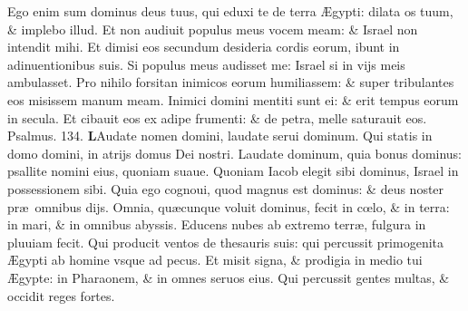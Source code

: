 \documentclass[a5paper,10pt]{book}
\def\ae{æ}
\def\AE{Æ}
\def\oe{œ}
\begin{document}
\begin{multicols*}{2}
\newline \color{red} E\color{black}go enim sum dominus deus tuus, qui eduxi te de terra \AE gypti: dilata os tuum, \& implebo illud.
\newline \color{red} E\color{black}t non audiuit populus meus vocem meam: \& Israel non intendit mihi.
\newline \color{red} E\color{black}t dimisi eos secundum desideria cordis eorum, ibunt in adinuentionibus suis.
\newline \color{red} S\color{black}i populus meus audisset me: Israel si in vijs meis ambulasset.
\newline \color{red} P\color{black}ro nihilo forsitan inimicos eorum humiliassem: \& super tribulantes eos misissem manum meam.
\newline \color{red} I\color{black}nimici domini mentiti sunt ei: \& erit tempus eorum in secula.
\newline \color{red} E\color{black}t cibauit eos ex adipe frumenti: \& de petra, melle saturauit eos.
\newline \color{red} Psalmus. \hypertarget{ps134}{134.} \color{black}
\vspace{-.5em}
\lettrine[lines=2]{\bfseries \color{red} L}{}Audate nomen domini, laudate serui dominum.
\newline \color{red} Q\color{black}ui statis in domo domini, in atrijs domus Dei nostri.
\newline \color{red} L\color{black}audate dominum, quia bonus dominus: psallite nomini eius, quoniam suaue.
\newline \color{red} Q\color{black}uoniam Iacob elegit sibi dominus, Israel in possessionem sibi.
\newline \color{red} Q\color{black}uia ego cognoui, quod magnus est dominus: \& deus noster pr\ae \ omnibus dijs.
\newline \color{red} O\color{black}mnia, qu\ae cunque voluit dominus, fecit in c\oe lo, \& in terra: in mari, \& in omnibus abyssis.
\newline \color{red} E\color{black}ducens nubes ab extremo terr\ae , fulgura in pluuiam fecit.
\newline \color{red} Q\color{black}ui producit ventos de thesauris suis: qui percussit primogenita \AE gypti ab homine vsque ad pecus.
\newline \color{red} E\color{black}t misit signa, \& prodigia in medio tui \AE gypte: in Pharaonem, \& in omnes seruos eius.
\newline \color{red} Q\color{black}ui percussit gentes multas, \& occidit reges fortes.

\end{multicols*}
\end{document}
